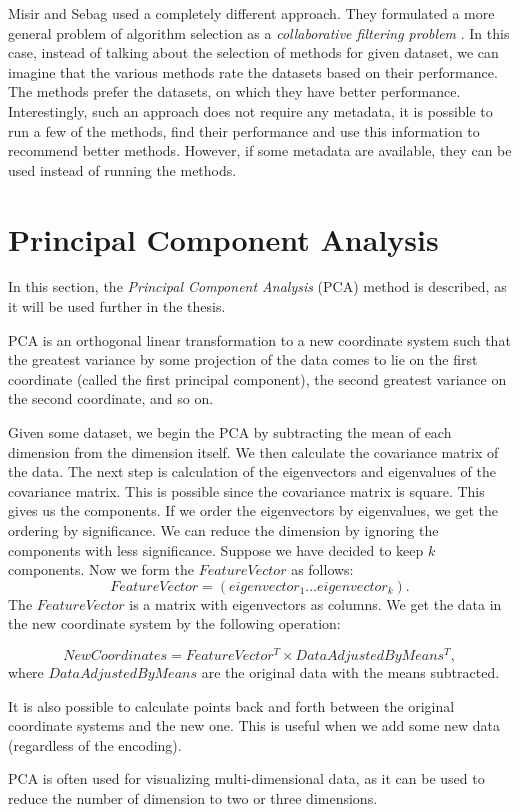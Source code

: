 	Misir and Sebag \cite{MisirAlgorithmSelectionAsCollaborativeFiltering} used a completely different approach.
	They formulated a more general problem of algorithm selection as a
	\emph{collaborative filtering problem} \cite{CollaborativeFilteringSurvey}. In this case,  instead of talking about the
	selection of methods for given dataset, we can imagine that the various methods
	rate the datasets based on their performance. The methods prefer the datasets,
	on which they have better performance. Interestingly, such an approach does not
	require any metadata, it is possible to run a few of the methods, find their
	performance and use this information to recommend better methods. However, if
	some metadata are available, they can be used instead of running the methods.
	
	\section{Principal Component Analysis}
	\label{section:pca}
	In this section, the \emph{Principal Component Analysis} (PCA) \cite{pca} method is described, as it will be used further in the thesis.
	
	PCA is an orthogonal linear transformation to a new coordinate system such that the greatest variance by some projection of the data comes to lie on the first coordinate (called the first principal component), the second greatest variance on the second coordinate, and so on. 
	
	Given some dataset, we begin the PCA by subtracting the mean of each dimension from the dimension itself. We then calculate the covariance matrix of the data. The next step is calculation of the eigenvectors and eigenvalues of the covariance matrix. This is possible since the covariance matrix is square. This gives us the components. If we order the eigenvectors by eigenvalues, we get the ordering by significance. We can reduce the dimension by ignoring the components with less significance.
	Suppose we have decided to keep $k$ components. Now we form the $FeatureVector$ as follows:
	\begin{equation*}
	FeatureVector = (eigenvector_1 \dots eigenvector_k).
	\end{equation*}
	The $FeatureVector$  is a matrix with eigenvectors as columns.
	We get the data in the new coordinate system by the following operation:
	
	\begin{equation*}
	NewCoordinates = FeatureVector^T \times DataAdjustedByMeans^T,
	\end{equation*}
	where $DataAdjustedByMeans$ are the original data with the means subtracted.
	
	It is also possible to calculate points back and forth between the original coordinate systems and the new one. This is useful when we add some new data (regardless of the encoding).
	
	PCA is often used for visualizing multi-dimensional data, as it can be used to reduce the number of dimension to two or three dimensions.



